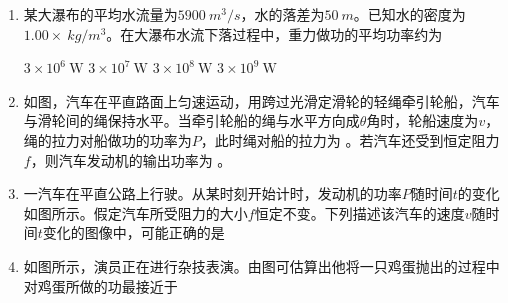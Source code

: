 

\begin{enumerate}[leftmargin=0em]
\renewcommand{\labelenumi}{\arabic{enumi}.}
\item
{}
某大瀑布的平均水流量为$ 5900\ m^{3}/s $，水的落差为$ 50\ m $。已知水的密度为$ 1.00 \times \ kg/m^{3} $。在大瀑布水流下落过程中，重力做功的平均功率约为  



\fourchoices
{$ 3 \times 10 ^ { 6 } \ \mathrm { W } $}
{$ 3 \times 10 ^ { 7 } \ \mathrm { W } $}
{$ 3 \times 10 ^ { 8 } \ \mathrm { W } $}
{$ 3 \times 10 ^ { 9 } \ \mathrm { W } $}




\item 
{}
如图，汽车在平直路面上匀速运动，用跨过光滑定滑轮的轻绳牵引轮船，汽车与滑轮间的绳保持水平。当牵引轮船的绳与水平方向成$ \theta $角时，轮船速度为$ v $，绳的拉力对船做功的功率为$ P $，此时绳对船的拉力为  
。若汽车还受到恒定阻力$ f $，则汽车发动机的输出功率为  
。
\begin{figure}[h!]
\centering

\end{figure}


\item
{}
一汽车在平直公路上行驶。从某时刻开始计时，发动机的功率$ P $随时间$ t $的变化如图所示。假定汽车所受阻力的大小$ f $恒定不变。下列描述该汽车的速度$ v $随时间$ t $变化的图像中，可能正确的是  

\begin{figure}[h!]
\centering
 \qquad 
  
\end{figure}


\item
{}
如图所示，演员正在进行杂技表演。由图可估算出他将一只鸡蛋抛出的过程中对鸡蛋所做的功最接近于  
\begin{figure}[h!]
\centering

\end{figure}


\end{enumerate}
